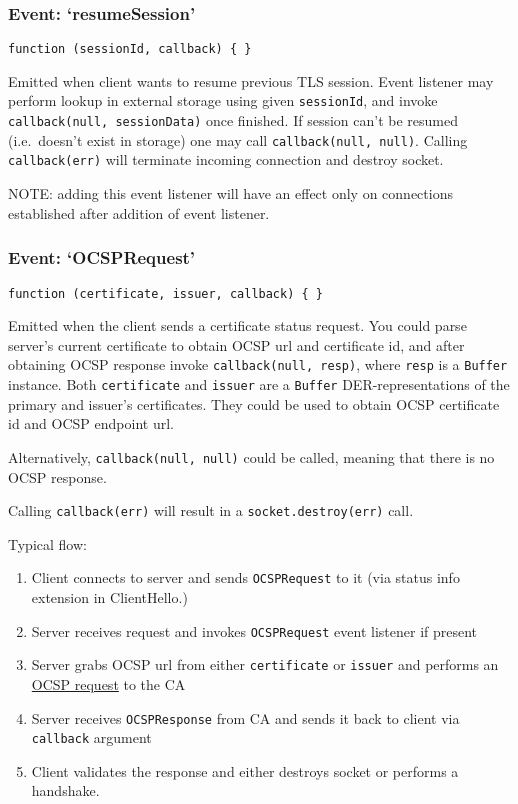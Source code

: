 \subsubsection{Event: `resumeSession'}\label{event-resumesession}

\texttt{function (sessionId, callback) \{ \}}

Emitted when client wants to resume previous TLS session. Event listener
may perform lookup in external storage using given \texttt{sessionId},
and invoke \texttt{callback(null, sessionData)} once finished. If
session can't be resumed (i.e.~doesn't exist in storage) one may call
\texttt{callback(null, null)}. Calling \texttt{callback(err)} will
terminate incoming connection and destroy socket.

NOTE: adding this event listener will have an effect only on connections
established after addition of event listener.

\subsubsection{Event: `OCSPRequest'}\label{event-ocsprequest}

\texttt{function (certificate, issuer, callback) \{ \}}

Emitted when the client sends a certificate status request. You could
parse server's current certificate to obtain OCSP url and certificate
id, and after obtaining OCSP response invoke
\texttt{callback(null, resp)}, where \texttt{resp} is a \texttt{Buffer}
instance. Both \texttt{certificate} and \texttt{issuer} are a
\texttt{Buffer} DER-representations of the primary and issuer's
certificates. They could be used to obtain OCSP certificate id and OCSP
endpoint url.

Alternatively, \texttt{callback(null, null)} could be called, meaning
that there is no OCSP response.

Calling \texttt{callback(err)} will result in a
\texttt{socket.destroy(err)} call.

Typical flow:

\begin{enumerate}
\def\labelenumi{\arabic{enumi}.}
\itemsep1pt\parskip0pt
\item
  Client connects to server and sends \texttt{OCSPRequest} to it (via
  status info extension in ClientHello.)
\item
  Server receives request and invokes \texttt{OCSPRequest} event
  listener if present
\item
  Server grabs OCSP url from either \texttt{certificate} or
  \texttt{issuer} and performs an
  \href{http://en.wikipedia.org/wiki/OCSP_stapling}{OCSP request} to the
  CA
\item
  Server receives \texttt{OCSPResponse} from CA and sends it back to
  client via \texttt{callback} argument
\item
  Client validates the response and either destroys socket or performs a
  handshake.
\end{enumerate}

